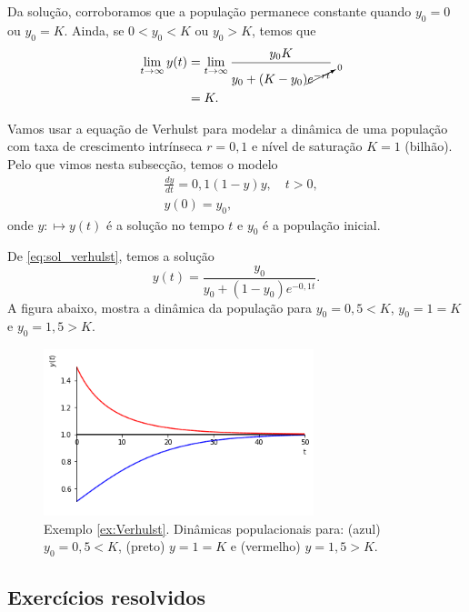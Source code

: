 Da solução, corroboramos que a população permanece constante quando $y_0 = 0$ ou $y_0 = K$. Ainda, se $0<y_0<K$ ou $y_0 > K$, temos que
\begin{align}
  \lim_{t\to\infty} y(t) &= \lim_{t\to\infty} \frac{y_0K}{y_0 + (K-y_0)\cancelto{0}{e^{-rt}}} \\
                         &= K.
\end{align}

\begin{ex}\label{ex:Verhulst}
Vamos usar a equação de Verhulst para modelar a dinâmica de uma população com taxa de crescimento intrínseca $r=0,1$ e nível de saturação $K=1$ (bilhão). Pelo que vimos nesta subsecção, temos o modelo
\begin{align}
  &\frac{dy}{dt} = 0,1\left(1 - y\right)y,\quad t>0,\\
  &y(0) = y_0,
\end{align}
onde $y:\mapsto y(t)$ é a solução no tempo $t$ e $y_0$ é a população inicial.

De \ref{eq:sol_verhulst}, temos a solução
\begin{equation}
  y(t) = \frac{y_0}{y_0 + (1-y_0)e^{-0,1t}}.
\end{equation}
A figura abaixo, mostra a dinâmica da população para $y_0=0,5<K$, $y_0=1=K$ e $y_0=1,5>K$.

\begin{figure}[H]
  \centering
  \includegraphics[width=0.7\textwidth]{cap_edo1ordem/dados/fig_ex_Verhulst/fig_ex_Verhulst}
  \caption{Exemplo \ref{ex:Verhulst}. Dinâmicas populacionais para: (azul) $y_0=0,5<K$, (preto) $y=1=K$ e (vermelho) $y=1,5>K$.}
  \label{fig:ex_Verhulst}
\end{figure}
\end{ex}

\subsection*{Exercícios resolvidos}

